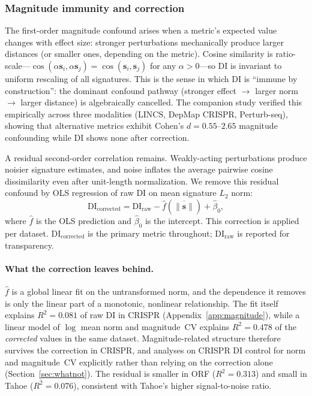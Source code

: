 \documentclass[11pt]{article}
\begin{document}
\subsubsection*{Magnitude immunity and correction}

The first-order magnitude confound arises when a metric's expected value
changes with effect size: stronger perturbations mechanically produce
larger distances (or smaller ones, depending on the metric).  Cosine
similarity is ratio-scale---$\cos(\alpha \mathbf{s}_i,
\alpha \mathbf{s}_j) = \cos(\mathbf{s}_i, \mathbf{s}_j)$ for any
$\alpha > 0$---so DI is invariant to uniform rescaling of all
signatures.  This is the sense in which DI is ``immune by
construction'': the dominant confound pathway (stronger effect
$\to$ larger norm $\to$ larger distance) is algebraically cancelled.
The companion study \citep{tower2026confound} verified this empirically
across three modalities (LINCS, DepMap CRISPR, Perturb-seq), showing
that alternative metrics exhibit Cohen's $d = 0.55$--$2.65$ magnitude
confounding while DI shows none after correction.

A residual second-order correlation remains.  Weakly-acting
perturbations produce noisier signature estimates, and noise inflates
the average pairwise cosine dissimilarity even after unit-length
normalization.  We remove this residual confound by OLS regression of
raw DI on mean signature $L_2$ norm:
\begin{equation}
\mathrm{DI}_{\mathrm{corrected}} = \mathrm{DI}_{\mathrm{raw}}
  - \hat{f}(\overline{\|\mathbf{s}\|}) + \hat{\beta}_0,
\label{eq:magnitude}
\end{equation}
where $\hat{f}$ is the OLS prediction and $\hat{\beta}_0$ is the
intercept.  This correction is applied per dataset.
$\mathrm{DI}_{\mathrm{corrected}}$ is the primary metric throughout;
$\mathrm{DI}_{\mathrm{raw}}$ is reported for transparency.

\paragraph{What the correction leaves behind.}
$\hat{f}$ is a global linear fit on the untransformed norm, and the dependence
it removes is only the linear part of a monotonic, nonlinear relationship.  The
fit itself explains $R^2 = 0.081$ of raw DI in CRISPR
(Appendix~\ref{app:magnitude}), while a linear model of $\log$ mean norm and
magnitude~CV explains $R^2 = 0.478$ of the \emph{corrected} values in the same
dataset.  Magnitude-related structure therefore survives the correction in
CRISPR, and analyses on CRISPR DI control for norm and magnitude~CV explicitly
rather than relying on the correction alone (Section~\ref{sec:whatnot}).  The
residual is smaller in ORF ($R^2 = 0.313$) and small in Tahoe
($R^2 = 0.076$), consistent with Tahoe's higher signal-to-noise ratio.
\end{document}
